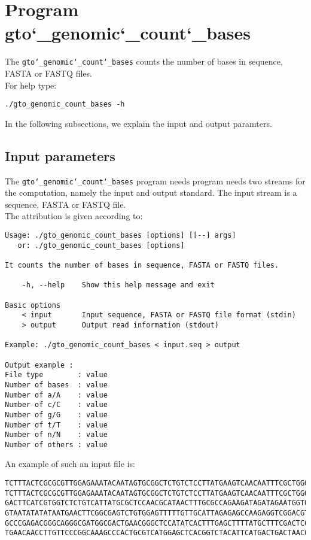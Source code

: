 \section{Program gto\char`_genomic\char`_count\char`_bases}
The \texttt{gto\char`_genomic\char`_count\char`_bases} counts the number of bases in sequence, FASTA or FASTQ files.\\
For help type:
\begin{lstlisting}
./gto_genomic_count_bases -h
\end{lstlisting}
In the following subsections, we explain the input and output paramters.

\subsection*{Input parameters}

The \texttt{gto\char`_genomic\char`_count\char`_bases} program needs program needs two streams for the computation, namely the input and output standard. The input stream is a sequence, FASTA or FASTQ file.\\
The attribution is given according to:
\begin{lstlisting}
Usage: ./gto_genomic_count_bases [options] [[--] args]
   or: ./gto_genomic_count_bases [options]

It counts the number of bases in sequence, FASTA or FASTQ files.

    -h, --help    Show this help message and exit

Basic options
    < input       Input sequence, FASTA or FASTQ file format (stdin)
    > output      Output read information (stdout)

Example: ./gto_genomic_count_bases < input.seq > output

Output example :
File type        : value
Number of bases  : value
Number of a/A    : value
Number of c/C    : value
Number of g/G    : value
Number of t/T    : value
Number of n/N    : value
Number of others : value
\end{lstlisting}
An example of such an input file is:
\begin{lstlisting}
TCTTTACTCGCGCGTTGGAGAAATACAATAGTGCGGCTCTGTCTCCTTATGAAGTCAACAATTTCGCTGGGACTTGCGGC
TCTTTACTCGCGCGTTGGAGAAATACAATAGTGCGGCTCTGTCTCCTTATGAAGTCAACAATTTCGCTGGGACTTGCGGC
GACTTCATCGTGGTCTCTGTCATTATGCGCTCCAACGCATAACTTTGCGCCAGAAGATAGATAGAATGGTGTAAGAAACT
GTAATATATATAATGAACTTCGGCGAGTCTGTGGAGTTTTTGTTGCATTAGAGAGCCAAGAGGTCGGACGTCCTCACGTA
GCCCGAGACGGGCAGGGCGATGGCGACTGAACGGGCTCCATATCACTTTGAGCTTTTATGCTTTCGACTCCTCCAGGAGC
TGAACAACCTTGTTCCCGGCAAAGCCCACTGCGTCATGGAGCTCACGGTCTACATTCATGACTGACTAACCGTAAACTGC
\end{lstlisting}

